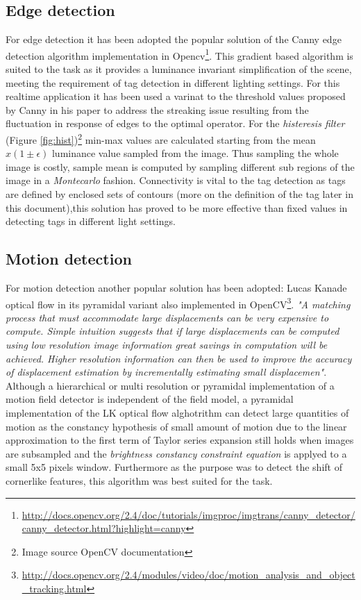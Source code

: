\documentclass[a4paper]{report}
\begin{document}
\subsection{Edge detection}
For edge detection it has been adopted the popular solution of the Canny\cite{Canny} edge detection algorithm implementation in Opencv\footnote{\url{http://docs.opencv.org/2.4/doc/tutorials/imgproc/imgtrans/canny_detector/canny_detector.html?highlight=canny}}. This gradient based algorithm is suited to the task as it provides a luminance invariant simplification of the scene, meeting the requirement of tag detection in different lighting settings.
For this realtime application it has been used a varinat to the threshold values proposed by Canny in his paper to address the streaking issue resulting from the fluctuation in response of edges to the optimal operator.  For the \textit{histeresis filter} (Figure \ref{fig:hist})\footnote{Image source OpenCV documentation} min-max values are calculated starting from the mean $\hat{x}( 1 \pm \epsilon)$ luminance value sampled from the image. Thus sampling the whole image is costly, sample mean is computed by sampling different sub regions of the image in a \textit{Montecarlo} fashion. Connectivity is vital to the tag detection as tags are defined by enclosed sets of contours (more on the definition of the tag later in this document),this solution has proved to be more effective than fixed values in detecting tags in different light settings.

\subsection{Motion detection}
For motion detection another popular solution has been adopted: Lucas Kanade optical flow in its pyramidal variant also implemented in OpenCV\footnote{\url{http://docs.opencv.org/2.4/modules/video/doc/motion_analysis_and_object_tracking.html}}. \textit{"A matching process that must accommodate large displacements can be very expensive to compute. Simple intuition suggests that if large displacements can be computed using low resolution image information great savings in computation will be achieved. Higher resolution information can then be used to improve the accuracy of displacement estimation by incrementally estimating small displacemen"}\cite{LK}.
Although a hierarchical or multi resolution or pyramidal implementation of a motion field detector is independent of the field model, a pyramidal implementation of the LK optical flow alghotrithm can detect large quantities of motion as the constancy hypothesis of small amount of motion due to the linear approximation to the first term of Taylor series expansion still holds when images are subsampled and the \textit{brightness constancy constraint equation} is applyed to a small 5x5 pixels window. Furthermore as the purpose was to detect the shift of cornerlike features, this algorithm was best suited for the task.
\end{document}
